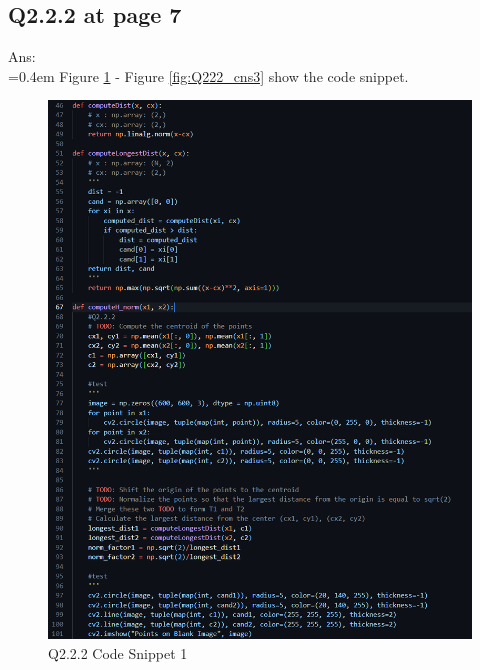 \documentclass{article}
\begin{document}
	\subsection*{Q2.2.2 at page 7}
	Ans:\\
	\hangindent=0.4em \hspace{0.3em} Figure \ref{fig:Q222_cns1} - Figure \ref{fig:Q222_cns3} show the code snippet.
	\begin{figure}[H]
	\centering
	\begin{minipage}[b]{0.45\textwidth}
		\centering
		\includegraphics[width=\textwidth]{Q2_2_2_cns1.png}  %
		\caption{Q2.2.2 Code Snippet 1}
		\label{fig:Q222_cns1}
	\end{minipage}
	\hfill  %
	\begin{minipage}[b]{0.45\textwidth}
		\centering

\end{minipage}
\end{figure}
\end{document}
